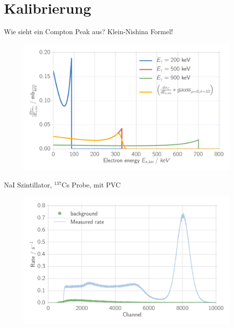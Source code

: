 \documentclass[xcolor=x11names,compress]{beamer}
\renewcommand{\(}{\begin{columns}}
\renewcommand{\)}{\end{columns}}
\newcommand{\<}[1]{\begin{column}{#1}}
\renewcommand{\>}{\end{column}}
\begin{document}
\section{Kalibrierung}
\begin{frame}[t]{Wie sieht ein Compton Peak aus? Klein-Nishina Formel!}
\begin{figure}[htpb]
    \centering
    \includegraphics[width=1.0\linewidth]{../analysis/figures/theory_dsde}
\label{fig:theory_kn}
\end{figure}
\end{frame}

\begin{frame}[t]{NaI Szintillator, $^{137}$Cs Probe, mit PVC}
 \begin{figure}[htpb]
    \centering
    \includegraphics[width=1.0\linewidth]{../analysis/figures/histo_na_137cs_nolegend}
    \label{fig:histo_na_137cs}
\end{figure}
\end{frame}
\end{document}
